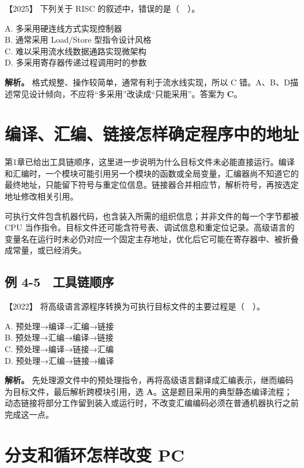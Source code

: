 \noindent{}【2025】 下列关于 RISC 的叙述中，错误的是（　）。

A. 多采用硬连线方式实现控制器\\
B. 通常采用 Load/Store 型指令设计风格\\
C. 难以采用流水线数据通路实现微架构\\
D. 多采用寄存器传递过程调用时的参数


\textbf{解析。} 格式规整、操作较简单，通常有利于流水线实现，所以 C 错。A、B、D描述常见设计倾向，不应将``多采用''改读成``只能采用''。答案为 \textbf{C}。

\section{编译、汇编、链接怎样确定程序中的地址}\label{co-04-05}

第1章已给出工具链顺序，这里进一步说明为什么目标文件未必能直接运行。编译和汇编时，一个模块可能引用另一个模块的函数或全局变量，汇编器尚不知道它的最终地址，只能留下符号与重定位信息。链接器合并相应节，解析符号，再按选定地址修改相关引用。

可执行文件包含机器代码，也含装入所需的组织信息；并非文件的每一个字节都被 CPU 当作指令。目标文件还可能含符号表、调试信息和重定位记录。高级语言的变量名在运行时未必仍对应一个固定主存地址，优化后它可能在寄存器中、被折叠成常量，或已经消失。

\subsection{例 4-5　工具链顺序}\label{co-ex4-5}

\noindent{}【2022】 将高级语言源程序转换为可执行目标文件的主要过程是（　）。

A. 预处理→编译→汇编→链接\\
B. 预处理→汇编→编译→链接\\
C. 预处理→编译→链接→汇编\\
D. 预处理→汇编→链接→编译


\textbf{解析。} 先处理源文件中的预处理指令，再将高级语言翻译成汇编表示，继而编码为目标文件，最后解析跨模块引用，选 \textbf{A}。这是题目采用的典型静态编译流程；动态链接将部分工作留到装入或运行时，不改变汇编编码必须在普通机器执行之前完成这一点。

\section{分支和循环怎样改变 PC}\label{co-04-06}

